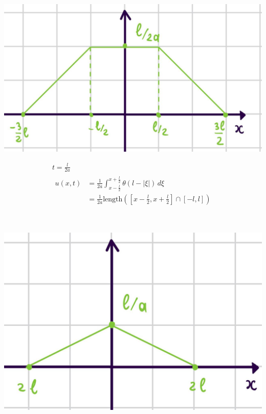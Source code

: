     \begin{minipage}{0.4\textwidth}
  \includegraphics[width=1\linewidth]{pictures/u7.jpg} 
    \end{minipage}
    \begin{minipage}{0.4\textwidth}\raggedleft
      \begin{gather*}
        t = \frac{l}{2a} \\
        \begin{split}
        u(x,t) &= \frac{1}{2a} \int_{x- \frac{l}{2}}^{x + \frac{l}{2}} \theta(l -|\xi| )\,d\xi \\
               &= \frac{1}{2a} \text{length}\left([x-\frac{l}{2},x+\frac{l}{2}]\cap [-l,l]\right)
        \end{split}
      \end{gather*}
    \end{minipage} \\
    \begin{minipage}{0.4\textwidth}
  \includegraphics[width=1\linewidth]{pictures/u8.jpg} 
    \end{minipage}
